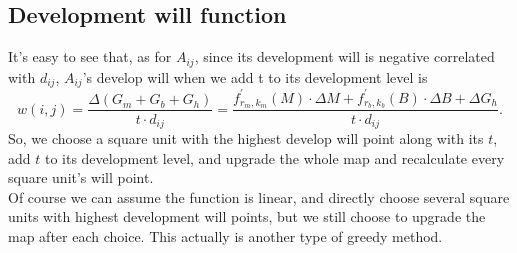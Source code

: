 \subsection{Development will function}
It's easy to see that, as for $ A_{ij} $, since its development will is negative correlated with $ d_{ij} $, $ A_{ij} $'s develop will when we add t to its development level is $$ w(i,j)=\frac{\Delta (G_m+G_b+G_h)}{t\cdot d_{ij}}=\frac{f_{r_m, k_m}^{'} (M) \cdot \Delta M + f_{r_b, k_b}^{'} (B) \cdot \Delta B + \Delta G_h}{t \cdot d_{ij}}. $$ So, we choose a square unit with the highest develop will point along with its $t$, add $t$ to its development level, and upgrade the whole map and recalculate every square unit's will point.
\\
Of course we can assume the function is linear, and directly choose several square units with highest development will points, but we still choose to upgrade the map after each choice.
This actually is another type of greedy method.

